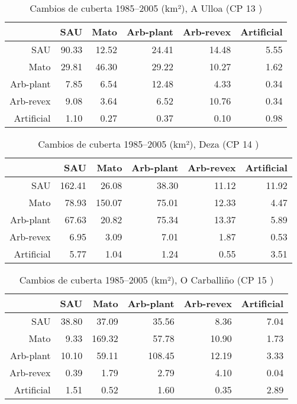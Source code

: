 \begin{table}[p]
\centering
\caption{Cambios de cuberta 1985--2005 (km²), A Ulloa (CP 13 )} 
\label{TaboaContinxCP13}
\begin{tabular}{rrrrrr}
  \hline
 & SAU & Mato & Arb-plant & Arb-revex & Artificial \\ 
  \hline
SAU & 90.33 & 12.52 & 24.41 & 14.48 & 5.55 \\ 
  Mato & 29.81 & 46.30 & 29.22 & 10.27 & 1.62 \\ 
  Arb-plant & 7.85 & 6.54 & 12.48 & 4.33 & 0.34 \\ 
  Arb-revex & 9.08 & 3.64 & 6.52 & 10.76 & 0.34 \\ 
  Artificial & 1.10 & 0.27 & 0.37 & 0.10 & 0.98 \\ 
   \hline
\end{tabular}
\end{table}
\begin{table}[p]
\centering
\caption{Cambios de cuberta 1985--2005 (km²), Deza (CP 14 )} 
\label{TaboaContinxCP14}
\begin{tabular}{rrrrrr}
  \hline
 & SAU & Mato & Arb-plant & Arb-revex & Artificial \\ 
  \hline
SAU & 162.41 & 26.08 & 38.30 & 11.12 & 11.92 \\ 
  Mato & 78.93 & 150.07 & 75.01 & 12.33 & 4.47 \\ 
  Arb-plant & 67.63 & 20.82 & 75.34 & 13.37 & 5.89 \\ 
  Arb-revex & 6.95 & 3.09 & 7.01 & 1.87 & 0.53 \\ 
  Artificial & 5.77 & 1.04 & 1.24 & 0.55 & 3.51 \\ 
   \hline
\end{tabular}
\end{table}
\begin{table}[p]
\centering
\caption{Cambios de cuberta 1985--2005 (km²), O Carballiño (CP 15 )} 
\label{TaboaContinxCP15}
\begin{tabular}{rrrrrr}
  \hline
 & SAU & Mato & Arb-plant & Arb-revex & Artificial \\ 
  \hline
SAU & 38.80 & 37.09 & 35.56 & 8.36 & 7.04 \\ 
  Mato & 9.33 & 169.32 & 57.78 & 10.90 & 1.73 \\ 
  Arb-plant & 10.10 & 59.11 & 108.45 & 12.19 & 3.33 \\ 
  Arb-revex & 0.39 & 1.79 & 2.79 & 4.10 & 0.04 \\ 
  Artificial & 1.51 & 0.52 & 1.60 & 0.35 & 2.89 \\ 
   \hline
\end{tabular}
\end{table}

